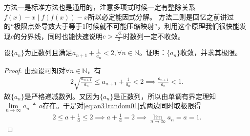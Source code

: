 \documentclass[../../main.tex]{subfiles}%
\begin{document}
\begin{remark}
{\color{blue}方法一}是标准方法也是通用的，注意多项式时候一定有整除关系\(f(x) - x\mid f(f(x)) - x\)所以必定能因式分解。
{\color{blue}方法二}则是回忆之前讲过的“极限点处导数大于等于1时候就不可能压缩映射”，利用这个原理我们很快能发现\(c\)的分界线，同时也能快速说明\(c>\frac{\sqrt{3}}{2}\)时数列一定不收敛。
\end{remark}

\begin{example}
设$\{a_n\}$为正数列且满足$a_{n+1}+\frac{1}{a_n}<2,\forall n\in \mathbb{N}$。证明：$\{a_n\}$收敛，并求其极限。
\end{example}
\begin{proof}
由题设可知对$\forall n\in \mathbb{N}$，有
\begin{align}
2\sqrt{\frac{a_{n+1}}{a_n}}\leqslant a_{n+1}+\frac{1}{a_n}<2\implies \frac{a_{n+1}}{a_n}<1.\label{eq:an31random01}
\end{align}
故$\{a_n\}$是严格递减数列。又因为$\{a_n\}$是正数列，所以由单调有界定理知$\lim\limits_{n\rightarrow \infty}a_n\triangleq a$存在。于是对\eqref{eq:an31random01}式两边同时取极限得
\begin{align*}
2\leqslant a+\frac{1}{a}\leqslant 2\implies a+\frac{1}{a}=2\implies \lim_{n\rightarrow \infty}a_n=a=1.
\end{align*}
\end{proof}
\end{document}

